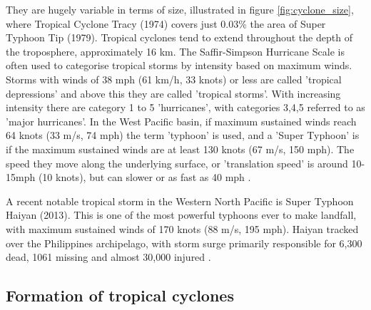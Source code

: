 They are hugely variable in terms of size, illustrated in figure \ref{fig:cyclone_size}, where Tropical Cyclone Tracy (1974) covers just 0.03\% the area of Super Typhoon Tip (1979). Tropical cyclones tend to extend throughout the depth of the troposphere, approximately 16 km. The Saffir-Simpson Hurricane Scale \citep{simpson1974hurricane} is often used to categorise tropical storms by intensity based on maximum winds. Storms with winds of 38 mph (61 km/h, 33 knots) or less are called 'tropical depressions' and above this they are called 'tropical storms'. With increasing intensity there are category 1 to 5 'hurricanes', with categories 3,4,5 referred to as 'major hurricanes'. In the West Pacific basin, if maximum sustained winds reach 64 knots (33 m/s, 74 mph) the term 'typhoon' is used, and a 'Super Typhoon' is if the maximum sustained winds are at least 130 knots (67 m/s, 150 mph). The speed they move along the underlying surface, or 'translation speed' is around 10-15mph (10 knots), but can slower or as fast as 40 mph \citep{mo_tc}.  

A recent notable tropical storm in the Western North Pacific is Super Typhoon Haiyan (2013). This is one of the most powerful typhoons ever to make landfall, with maximum sustained winds of 170 knots (88 m/s, 195 mph). Haiyan tracked over the Philippines archipelago, with storm surge primarily responsible for 6,300 dead, 1061 missing and almost 30,000 injured \citep{lagmay2015devastating}. %





\subsection{Formation of tropical cyclones}

